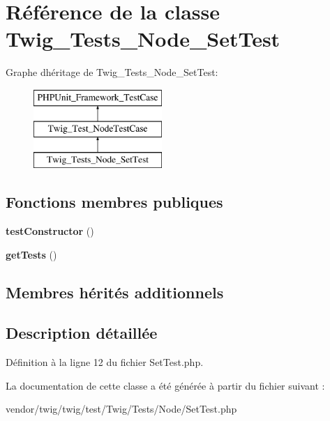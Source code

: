 \hypertarget{class_twig___tests___node___set_test}{}\section{Référence de la classe Twig\+\_\+\+Tests\+\_\+\+Node\+\_\+\+Set\+Test}
\label{class_twig___tests___node___set_test}
Graphe d\textquotesingle{}héritage de Twig\+\_\+\+Tests\+\_\+\+Node\+\_\+\+Set\+Test\+:\begin{figure}[H]
\begin{center}
\leavevmode
\includegraphics[height=3.000000cm]{class_twig___tests___node___set_test}
\end{center}
\end{figure}
\subsection*{Fonctions membres publiques}
\begin{DoxyCompactItemize}
\item 
{\bfseries test\+Constructor} ()\hypertarget{class_twig___tests___node___set_test_a47094dc941e72950570900d1418f89c6}{}\label{class_twig___tests___node___set_test_a47094dc941e72950570900d1418f89c6}

\item 
{\bfseries get\+Tests} ()\hypertarget{class_twig___tests___node___set_test_a7e247dd31cc8d37a6c97353a062a0080}{}\label{class_twig___tests___node___set_test_a7e247dd31cc8d37a6c97353a062a0080}

\end{DoxyCompactItemize}
\subsection*{Membres hérités additionnels}


\subsection{Description détaillée}


Définition à la ligne 12 du fichier Set\+Test.\+php.



La documentation de cette classe a été générée à partir du fichier suivant \+:\begin{DoxyCompactItemize}
\item 
vendor/twig/twig/test/\+Twig/\+Tests/\+Node/Set\+Test.\+php\end{DoxyCompactItemize}

